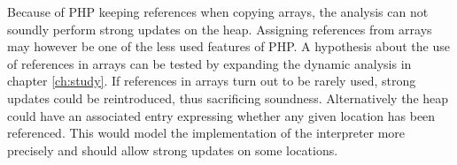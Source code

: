Because of PHP keeping references when copying arrays, the analysis can not soundly perform strong updates on the heap. Assigning references from arrays may however be one of the less used features of PHP. A hypothesis about the use of references in arrays can be tested by expanding the dynamic analysis in chapter \ref{ch:study}. If references in arrays turn out to be rarely used, strong updates could be reintroduced, thus sacrificing soundness. Alternatively the heap could have an associated entry expressing whether any given location has been referenced. This would model the implementation of the interpreter more precisely and should allow strong updates on some locations.


 